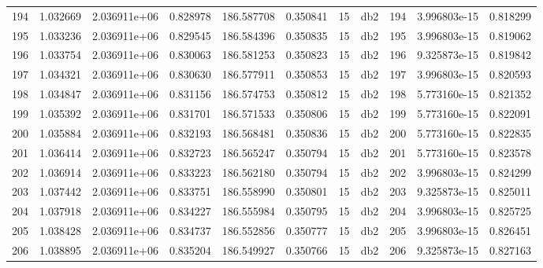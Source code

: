 \begin{tabular}{lrrrrrrlrrr}
194  &    1.032669 &        2.036911e+06 &  0.828978 &              186.587708 &    0.350841 &      15 &          db2 &    194 &   3.996803e-15 &      0.818299 \\
195  &    1.033236 &        2.036911e+06 &  0.829545 &              186.584396 &    0.350835 &      15 &          db2 &    195 &   3.996803e-15 &      0.819062 \\
196  &    1.033754 &        2.036911e+06 &  0.830063 &              186.581253 &    0.350823 &      15 &          db2 &    196 &   9.325873e-15 &      0.819842 \\
197  &    1.034321 &        2.036911e+06 &  0.830630 &              186.577911 &    0.350853 &      15 &          db2 &    197 &   3.996803e-15 &      0.820593 \\
198  &    1.034847 &        2.036911e+06 &  0.831156 &              186.574753 &    0.350812 &      15 &          db2 &    198 &   5.773160e-15 &      0.821352 \\
199  &    1.035392 &        2.036911e+06 &  0.831701 &              186.571533 &    0.350806 &      15 &          db2 &    199 &   5.773160e-15 &      0.822091 \\
200  &    1.035884 &        2.036911e+06 &  0.832193 &              186.568481 &    0.350836 &      15 &          db2 &    200 &   5.773160e-15 &      0.822835 \\
201  &    1.036414 &        2.036911e+06 &  0.832723 &              186.565247 &    0.350794 &      15 &          db2 &    201 &   5.773160e-15 &      0.823578 \\
202  &    1.036914 &        2.036911e+06 &  0.833223 &              186.562180 &    0.350794 &      15 &          db2 &    202 &   3.996803e-15 &      0.824299 \\
203  &    1.037442 &        2.036911e+06 &  0.833751 &              186.558990 &    0.350801 &      15 &          db2 &    203 &   9.325873e-15 &      0.825011 \\
204  &    1.037918 &        2.036911e+06 &  0.834227 &              186.555984 &    0.350795 &      15 &          db2 &    204 &   3.996803e-15 &      0.825725 \\
205  &    1.038428 &        2.036911e+06 &  0.834737 &              186.552856 &    0.350777 &      15 &          db2 &    205 &   3.996803e-15 &      0.826451 \\
206  &    1.038895 &        2.036911e+06 &  0.835204 &              186.549927 &    0.350766 &      15 &          db2 &    206 &   9.325873e-15 &      0.827163 \\

\end{tabular}
